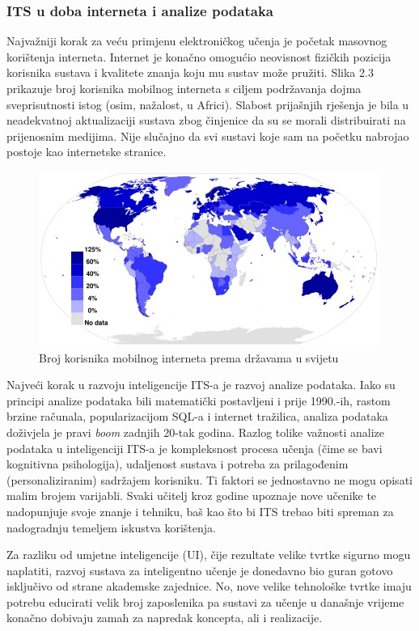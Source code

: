 \documentclass[times, utf8, zavrsni, numeric]{fer}
\begin{document}
\subsubsection{ITS u doba interneta i analize podataka}
Najvažniji korak za veću primjenu elektroničkog učenja je početak masovnog korištenja interneta. Internet je konačno omogućio neovisnost fizičkih pozicija korisnika sustava i kvalitete znanja koju mu sustav može pružiti. Slika 2.3 prikazuje broj korisnika mobilnog interneta s ciljem podržavanja dojma sveprisutnosti istog (osim, nažalost, u Africi). Slabost prijašnjih rješenja je bila u neadekvatnoj aktualizaciji sustava zbog činjenice da su se morali distribuirati na prijenosnim medijima. Nije slučajno da svi sustavi koje sam na početku nabrojao postoje kao internetske stranice.

\begin{figure}[htb]
	\centering
	\includegraphics[]{img/internet.jpg}
	\caption{Broj korisnika mobilnog interneta prema državama u svijetu\citep{mobilenet}}
	\label{fig:internet}
\end{figure}

\par
Najveći korak u razvoju inteligencije ITS-a je razvoj analize podataka. Iako su principi analize podataka bili matematički postavljeni i prije 1990.-ih, rastom brzine računala, popularizacijom SQL-a i internet tražilica, analiza podataka doživjela je pravi \textit{boom} zadnjih 20-tak godina. Razlog tolike važnosti analize podataka u inteligenciji ITS-a je kompleksnost procesa učenja (čime se bavi kognitivna psihologija), udaljenost sustava i potreba za prilagođenim (personaliziranim) sadržajem korisniku. Ti faktori se jednostavno ne mogu opisati malim brojem varijabli. Svaki učitelj kroz godine upoznaje nove učenike te nadopunjuje svoje znanje i tehniku, baš kao što bi ITS trebao biti spreman za nadogradnju temeljem iskustva korištenja.
\par
Za razliku od umjetne inteligencije (UI), čije rezultate velike tvrtke sigurno mogu naplatiti, razvoj sustava za inteligentno učenje je donedavno bio guran gotovo isključivo od strane akademske zajednice. No, nove velike tehnološke tvrtke imaju potrebu educirati velik broj zaposlenika pa sustavi za učenje u današnje vrijeme konačno dobivaju zamah za napredak koncepta, ali i realizacije.\citep{itspastpresentfuture}
\end{document}
